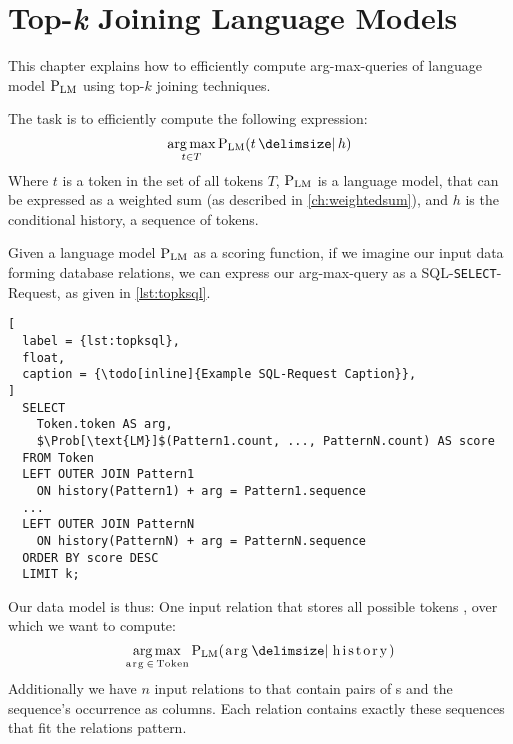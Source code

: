 \chapter{Top-\emph{k} Joining Language Models}
\label{ch:topkjoin}



This chapter explains how to efficiently compute arg-max-queries of language
model $\Prob[\text{LM}]$ using top-$k$ joining techniques.

The task is to efficiently compute the following expression:
\begin{equation}
  \Argmax_{t \in T} \Prob[\text{LM}]{t}{h}
\end{equation}
Where $t$ is a token in the set of all tokens $T$, $\Prob[\text{LM}]$ is a
language model, that can be expressed as a weighted sum (as described in
\cref{ch:weightedsum}), and $h$ is the conditional history, a sequence
of tokens.

Given a language model $\Prob[\text{LM}]$ as a scoring function, if we
imagine our input data forming database relations, we can express our
arg-max-query as a SQL-\texttt{SELECT}-Request, as given in \cref{lst:topksql}.

\begin{lstlisting}[
  label = {lst:topksql},
  float,
  caption = {\todo[inline]{Example SQL-Request Caption}},
]
  SELECT
    Token.token AS arg,
    $\Prob[\text{LM}]$(Pattern1.count, ..., PatternN.count) AS score
  FROM Token
  LEFT OUTER JOIN Pattern1
    ON history(Pattern1) + arg = Pattern1.sequence
  ...
  LEFT OUTER JOIN PatternN
    ON history(PatternN) + arg = PatternN.sequence
  ORDER BY score DESC
  LIMIT k;
\end{lstlisting}


Our data model is thus: One input relation  that stores
all possible tokens , over which we want to compute:
\begin{equation}
  \Argmax_{\text{\inlinecode{arg}} \, \in \, \text{\inlinecode{Token}}}
    \Prob[\text{LM}]{\text{\inlinecode{arg}}}{\text{\inlinecode{history}}}
\end{equation}
Additionally we have $n$ input relations
 to  that contain pairs
of s and the sequence's occurrence  as
columns.
Each  relation contains exactly these sequences that fit the
relations pattern.

